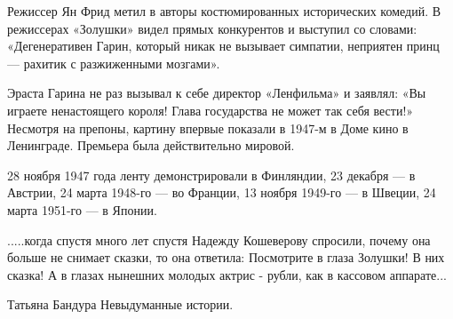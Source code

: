 Режиссер Ян Фрид метил в авторы костюмированных исторических комедий. В
режиссерах «Золушки» видел прямых конкурентов и выступил со словами:
«Дегенеративен Гарин, который никак не вызывает симпатии, неприятен принц —
рахитик с разжиженными мозгами».

Эраста Гарина не раз вызывал к себе директор «Ленфильма» и заявлял: «Вы играете
ненастоящего короля! Глава государства не может так себя вести!» Несмотря на
препоны, картину впервые показали в 1947-м в Доме кино в Ленинграде.  Премьера
была действительно мировой.

28 ноября 1947 года ленту демонстрировали в Финляндии, 23 декабря — в Австрии,
24 марта 1948-го — во Франции, 13 ноября 1949-го — в Швеции, 24 марта 1951-го —
в Японии.

.....когда спустя много лет спустя Надежду Кошеверову спросили, почему она больше не снимает сказки, то она ответила: Посмотрите в глаза Золушки! В них сказка! А в глазах нынешних молодых актрис - рубли, как в кассовом аппарате...

Татьяна Бандура
Невыдуманные истории.
